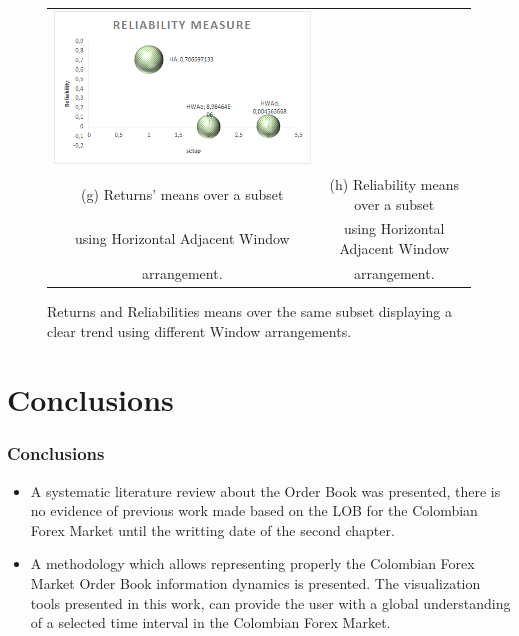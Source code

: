 \documentclass{beamer}
\begin{document}
\begin{frame}
\begin{figure}
\begin{tabular}{c c}
        \includegraphics[scale=0.5]{TrendHAReliability.png} \\
    \scriptsize (g) Returns' means over a subset & \scriptsize (h) Reliability means over a subset \\
		\scriptsize using Horizontal Adjacent Window & \scriptsize using Horizontal Adjacent Window \\
		\scriptsize arrangement. & \scriptsize arrangement.\\
		\end{tabular}	
    \caption{Returns and Reliabilities means over the same subset displaying a clear trend using different Window arrangements.}\label{fig:TrendHA}
\end{figure}
\end{frame}

\section{Conclusions}

\begin{frame}
\frametitle{Conclusions}
\begin{itemize}
	\item A systematic literature review about the Order Book was presented, there is no evidence of previous work made based on the LOB for the Colombian Forex Market until the writting date of the second chapter.
	\item  A methodology which allows representing properly the Colombian Forex Market Order Book information dynamics is presented. The visualization tools presented in this work, can provide the user with a global understanding of a selected time interval in the Colombian Forex Market.
\end{itemize}

\end{frame}
\end{document}
